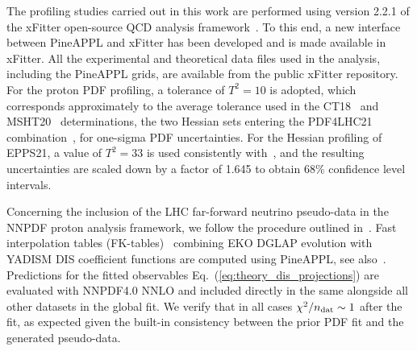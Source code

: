The profiling studies carried out in this work are performed using version 2.2.1
of the 
{\sc\small xFitter} open-source QCD analysis framework~\cite{Alekhin:2014irh, Bertone:2017tig, xFitter:2022zjb, xFitter:web}.
%
To this end, a new interface between  {\sc\small PineAPPL} and {\sc\small xFitter} has been developed and is made available in {\sc\small xFitter}.
%
All the experimental and theoretical data files used in the analysis, including
the  {\sc\small PineAPPL}  grids, are available
from the public {\sc\small xFitter} repository.
%
For the proton PDF profiling, a tolerance of $T^2 = 10$ is adopted,
which  corresponds approximately to the average tolerance
used in the CT18~\cite{Hou:2019efy} and MSHT20~\cite{Bailey:2020ooq} determinations,
the two Hessian sets entering the PDF4LHC21 combination~\cite{PDF4LHCWorkingGroup:2022cjn}, for
one-sigma PDF uncertainties.
%
For the Hessian profiling of EPPS21, a value of $T^2 = 33$ is used consistently with~\cite{Eskola:2021nhw}, and the resulting uncertainties are scaled down by a factor of 1.645 to obtain 68\% confidence level intervals.

Concerning the inclusion of the LHC far-forward neutrino pseudo-data
in the NNPDF proton analysis framework, we follow the procedure
outlined in~\cite{NNPDF:2021uiq}.
%
Fast interpolation tables (FK-tables)~\cite{Ball:2010de} combining {\sc\small EKO}
DGLAP evolution with {\sc\small YADISM} DIS coefficient functions
are computed using {\sc\small PineAPPL}, see also~\cite{Barontini:2023vmr}.
%
Predictions for the fitted observables Eq.~(\ref{eq:theory_dis_projections}) are evaluated
with NNPDF4.0 NNLO and included
directly in the same alongside all other datasets in the global fit.
%
We verify that in all cases $\chi^2/n_{\rm dat}\sim 1$ after the fit,
as expected given the built-in consistency between the prior PDF fit
and the generated pseudo-data.




